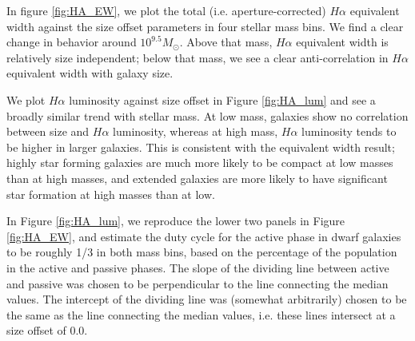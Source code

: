 \documentclass[iop]{emulateapj}
\begin{document}
In figure \ref{fig:HA_EW}, we plot the total (i.e. aperture-corrected) $H\alpha$ equivalent width against the size offset parameters in four stellar mass bins. We find a clear change in behavior around $10^{9.5} M_{\odot}$. Above that mass, $H\alpha$ equivalent width is relatively size independent; below that mass, we see a clear anti-correlation in  $H \alpha$ equivalent width with galaxy size.

We plot $H\alpha$ luminosity against size offset in Figure \ref{fig:HA_lum} and see a broadly similar trend with stellar mass. At low mass, galaxies show no correlation between size and $H\alpha$ luminosity, whereas at high mass, $H\alpha$ luminosity tends to be higher in larger galaxies. This is consistent with the equivalent width result; highly star forming galaxies are much more likely to be compact at low masses than at high masses, and extended galaxies are more likely to have significant star formation at high masses than at low.   

In Figure \ref{fig:HA_lum}, we reproduce the lower two panels in Figure \ref{fig:HA_EW}, and estimate the duty cycle for the active phase in dwarf galaxies to be roughly 1/3 in both mass bins, based on the percentage of the population in the active and passive phases. The slope of the dividing line between active and passive was chosen to be perpendicular to the line connecting the median values. The intercept of the dividing line was (somewhat arbitrarily) chosen to be the same as the line connecting the median values, i.e. these lines intersect at a size offset of 0.0. 
\end{document}
